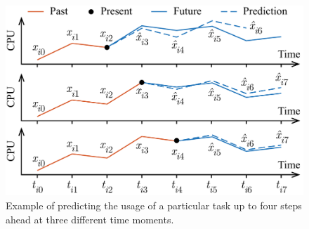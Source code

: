 \begin{figure}[b]
  \centering
  \vspace{-1.5em}
  \includegraphics[width=1.0\columnwidth]{include/assets/figures/example.pdf}
  \vspace{-1.5em}
  \caption{
    Example of predicting the  usage of a particular task up to four
    steps ahead at three different time moments.
  }
\end{figure}
